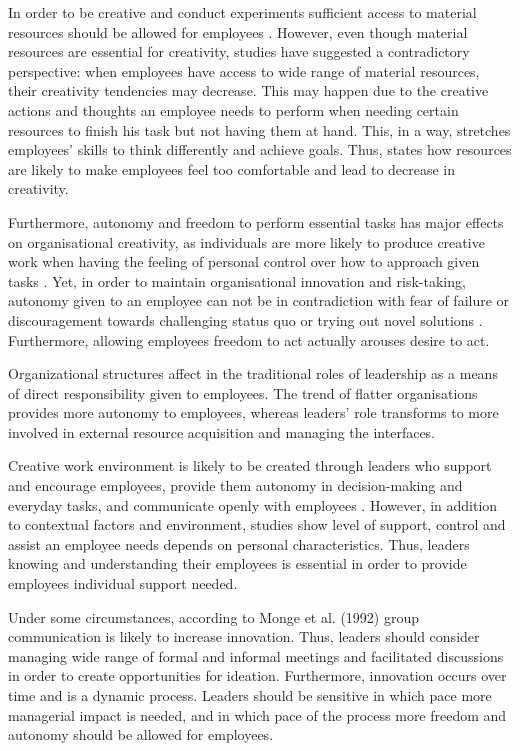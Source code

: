 In order to be creative and conduct experiments sufficient access to material resources should be allowed for employees \citep{katz1985project}. However, even though material resources are essential for creativity, studies have suggested a contradictory perspective: when employees have access to wide range of material resources, their creativity tendencies may decrease. This may happen due to the creative actions and thoughts an employee needs to perform when needing certain resources to finish his task but not having them at hand. This, in a way, stretches employees' skills to think differently and achieve goals. \citep{csikszentmihalyi199916} Thus, \citet{csikszentmihalyi199916} states how resources are likely to make employees feel too comfortable and lead to decrease in creativity. 

Furthermore, autonomy and freedom to perform essential tasks has major effects on organisational creativity, as individuals are more likely to produce creative work when having the feeling of personal control over how to approach given tasks \citep{amabile1996assessing}. Yet, in order to maintain organisational innovation and risk-taking, autonomy given to an employee can not be in contradiction with fear of failure or discouragement towards challenging status quo or trying out novel solutions \citep{yukl2002leadership}. Furthermore, allowing employees freedom to act actually arouses desire to act.\citep{kanter1983change}

Organizational structures affect in the traditional roles of leadership as a means of direct responsibility given to employees. The trend of flatter organisations provides more autonomy to employees, whereas leaders' role transforms to more involved in external resource acquisition and managing the interfaces. \citep{shalley2004leaders}

Creative work environment is likely to be created through leaders who support and encourage employees, provide them autonomy in decision-making and everyday tasks, and communicate openly with employees \citep{oldham1996employee,tierney1999examination}. However, in addition to contextual factors and environment, studies show level of support, control and assist an employee needs depends on personal characteristics. Thus, leaders knowing and understanding their employees is essential in order to provide employees individual support needed. \citep{shalley2004leaders}

Under some circumstances, according to Monge et al. (1992) \citet{monge1992communication} group communication is likely to increase innovation. Thus, leaders should consider managing wide range of formal and informal meetings and facilitated discussions in order to create opportunities for ideation. Furthermore, innovation occurs over time and is a dynamic process. Leaders should be sensitive in which pace more managerial impact is needed, and in which pace of the process more freedom and autonomy should be allowed for employees. \citep{monge1992communication} 

